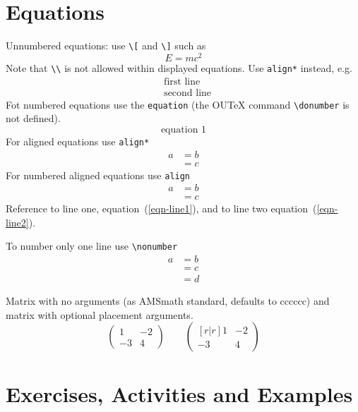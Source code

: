 \documentclass[solutionsatend]{ouunit}
\begin{document}
\section{Equations}
Unnumbered equations: use \verb”\[” and \verb”\]” such as
\[
E=mc^2
\]
Note that \verb”\\” is not allowed within displayed equations. Use \verb"align*" instead, e.g.
\begin{align*}
&\text{first line}\\
&\text{second line}
\end{align*}
Fot numbered equations use the \verb”equation” (the OUTeX command \verb”\donumber” is not defined).
\begin{equation}
\text{equation }1
\end{equation}
For aligned equations use \verb”align*”
\begin{align*}
a& =b\\
&=c
\end{align*}
For numbered aligned equations use \verb”align”
\begin{align}
a& =b\label{eqn-line1}\\
&=c\label{eqn-line2}
\end{align}
Reference to line one, equation~(\ref{eqn-line1}), and to line two equation~(\ref{eqn-line2}).

To number only one line use \verb”\nonumber”
\begin{align}
a& =b\nonumber\\
&=c\label{eqn-middle-line}\\
&=d\nonumber
\end{align}

Matrix with no arguments (as AMSmath standard, defaults to cccccc) and matrix with optional placement arguments.
\[
\begin{pmatrix}
1 & -2\\
-3 & 4
\end{pmatrix}
\qquad
\begin{pmatrix}[r|r]
1 & -2\\
-3 & 4
\end{pmatrix}
\]

\section{Exercises, Activities and Examples}

\lipsum[133]

\lipsum[134]
\end{document}
